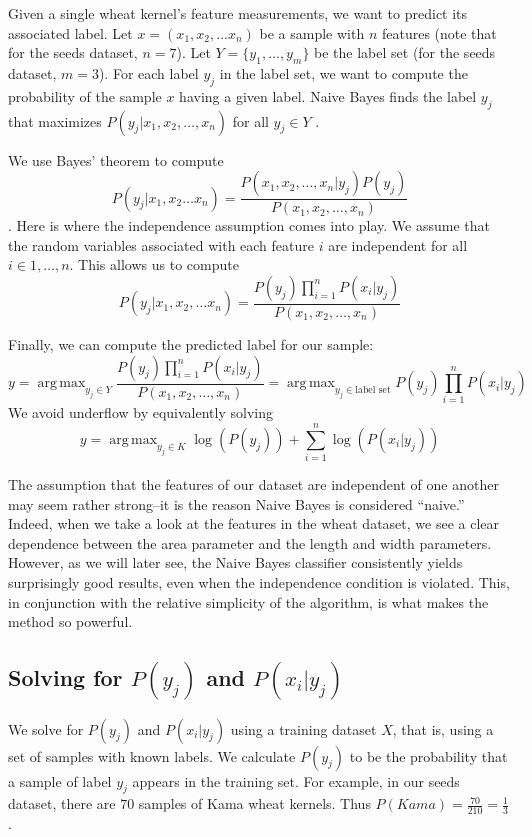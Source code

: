 \documentclass[12pt]{article}
\DeclareMathOperator*{\argmax}{\arg\,max}
\begin{document}
Given a single wheat kernel's feature measurements, we want to predict its associated label.
Let $x = (x_1, x_2, \ldots x_n)$ be a sample with $n$ features (note that for the seeds dataset, $n = 7$). 
Let $Y = \{y_1, \ldots, y_m\}$ be the label set (for the seeds dataset, $m=3$).
For each label $y_j$ in the label set, we want to compute the probability of the sample $x$ having a given label.
Naive Bayes finds the label $y_j$ that maximizes $P(y_j | x_1, x_2, \ldots, x_n)$ for all $y_j \in Y$ \cite{NaiveBayes}.

 We use Bayes' theorem to compute $$P(y_j|x_1, x_2 \ldots x_n) = \frac{P(x_1, x_2, \ldots, x_n|y_j) P(y_j)}{P(x_1, x_2, \ldots, x_n)}$$.
 Here is where the independence assumption comes into play. 
 We assume that the random variables associated with each feature $i$ are independent for all $i \in {1, \ldots, n}$.
This allows us to compute $$P(y_j|x_1, x_2, \ldots x_n) = \frac{P(y_j) \prod_{i=1}^n P(x_i|y_j)}{P(x_1, x_2, \ldots, x_n)}$$

Finally, we can compute the predicted label for our sample:
$$y = \argmax_{y_j \in Y} \frac{P(y_j) \prod_{i=1}^n P(x_i|y_j)}{P(x_1, x_2, \ldots, x_n)} = \argmax_{y_j \in \text{label set}}P(y_j) \prod_{i=1}^n P(x_i|y_j) $$
We avoid underflow by equivalently solving
$$y = \argmax_{y_j \in K}\log(P(y_j)) + \sum_{i=1}^n \log(P(x_i|y_j))$$

The assumption that the features of our dataset are independent of one another may seem rather strong--it is the reason Naive Bayes is considered ``naive.''
 Indeed, when we take a look at the features in the wheat dataset, we see a clear dependence between the area parameter and the length and width parameters. 
 However, as we will later see, the Naive Bayes classifier consistently yields surprisingly good results, even when the independence condition is violated.
 This, in conjunction with the relative simplicity of the algorithm, is what makes the method so powerful. 
 
\subsection*{Solving for $P(y_j)$ and $P(x_i|y_j)$}
We solve for $P(y_j)$ and $P(x_i|y_j)$ using a training dataset $X$, that is, using a set of samples with known labels.
We calculate $P(y_j)$ to be the probability that a sample of label $y_j$ appears in the training set. 
For example, in our seeds dataset, there are $70$ samples of Kama wheat kernels. 
Thus $P(Kama) = \frac{70}{210} = \frac{1}{3}$.
\end{document}
